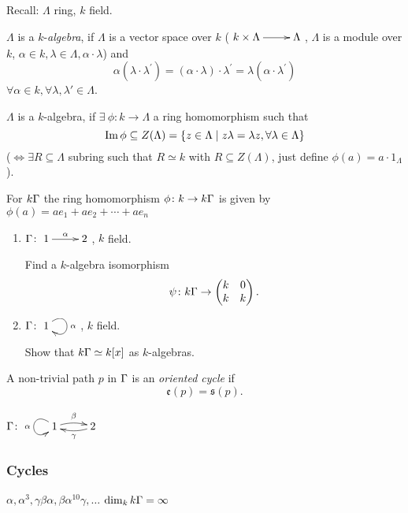 Recall: $\Lambda$ ring, $k$ field. 
\begin{defin}
  $\Lambda$ is a $k$-\emph{algebra}, if $\Lambda$ is a
  vector space over $k$ ($\xymatrix{k\times\Lambda \ar[r] & \Lambda}$,
  $\Lambda$ is a module over $k$,
  $\alpha \in k, \lambda \in \Lambda, \alpha\cdot\lambda$) and
\[\alpha(\lambda\cdot\lambda^{'})=(\alpha\cdot\lambda)\cdot\lambda^{'}
  = \lambda(\alpha\cdot\lambda^{'})\]
  $\forall \alpha \in k, \forall \lambda,
  \lambda'\in\Lambda$. 
	
\begin{note}
  $\Lambda$ is a $k$-algebra, if $\exists\ \phi\colon k \to \Lambda$ a
  ring homomorphism such that
 \[\operatorname{Im}\nolimits\phi \subseteq Z(\Lambda)= \{z\in \Lambda \mid 
  z\lambda=\lambda z,\forall \lambda \in \Lambda\}\]
  ($\iff \exists R \subseteq \Lambda$ subring such that $R \simeq k$
  with $R \subseteq Z(\Lambda)$, just define $\phi (a)=a \cdot
  1_{\Lambda}$). 
\end{note}
  For $ k\Gamma $ the ring homomorphism $\phi \colon k \rightarrow k\Gamma $
  is given by $\phi(a) = ae_1 + ae_2 + \cdots + ae_n$
\end{defin}
\begin{exer}
\begin{enumerate}
\item $\Gamma\colon \xymatrix{1\ar[r]^\alpha & 2}$, $k$ field. 

Find a $k$-algebra isomorphism
\[\psi\colon k\Gamma \rightarrow \begin{pmatrix}
    k & 0\\
    k & k
  \end{pmatrix}.\]
\item $\G\colon \xymatrix{1\ar@(ur,dr)[]^\alpha}$,  $k$ field.

Show that $k\Gamma\simeq k[x]$ as $k$-algebras.
\end{enumerate}
\end{exer}

\begin{defin}
  A non-trivial path $p$ in $\Gamma$ is an \emph{oriented
    cycle} if
  \[\mathfrak{e}(p) = \mathfrak{s}(p).\]
\end{defin}

\begin{exam}
  $\G\colon \xymatrix{\ar@(ul,dl)[]_\alpha 1 \ar@/^.3pc/[r]^\beta &
    \ar@/^.3pc/[l]^\gamma 2}$\\ \newline 

\subsubsection*{Cycles}
  $\alpha,\alpha^3,\gamma\beta\alpha,\beta\alpha^{10}\gamma, \ldots$
  $\dim_k k\Gamma = \infty$
\end{exam}

